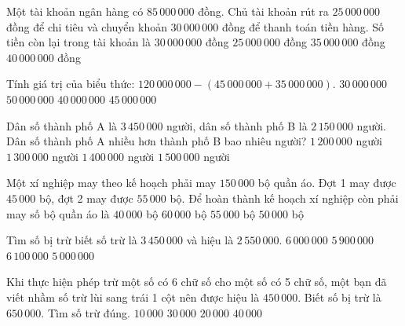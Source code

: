 \begin{ex} %
Một tài khoản ngân hàng có $85\,000\,000$ đồng. Chủ tài khoản rút ra $25\,000\,000$ đồng để chi tiêu và chuyển khoản $30\,000\,000$ đồng để thanh toán tiền hàng. Số tiền còn lại trong tài khoản là
\choice
{\True $30\,000\,000$ đồng}
{$25\,000\,000$ đồng}
{$35\,000\,000$ đồng}
{$40\,000\,000$ đồng}
\end{ex}

\begin{ex} %
Tính giá trị của biểu thức: $120\,000\,000 - (45\,000\,000 + 35\,000\,000)$.
\choice
{$30\,000\,000$}
{$50\,000\,000$}
{\True $40\,000\,000$}
{$45\,000\,000$}
\end{ex}

\begin{ex} %
Dân số thành phố A là $3\,450\,000$ người, dân số thành phố B là $2\,150\,000$ người. Dân số thành phố A nhiều hơn thành phố B bao nhiêu người?
\choice
{$1\,200\,000$ người}
{\True $1\,300\,000$ người}
{$1\,400\,000$ người}
{$1\,500\,000$ người}
\end{ex}

\begin{ex} %
Một xí nghiệp may theo kế hoạch phải may $150\,000$ bộ quần áo. Đợt 1 may được $45\,000$ bộ, đợt 2 may được $55\,000$ bộ. Để hoàn thành kế hoạch xí nghiệp còn phải may số bộ quần áo là
\choice
{$40\,000$ bộ}
{$60\,000$ bộ}
{$55\,000$ bộ}
{\True $50\,000$ bộ}
\end{ex}

\begin{ex} %
Tìm số bị trừ biết số trừ là $3\,450\,000$ và hiệu là $2\,550\,000$.
\choice
{\True $6\,000\,000$}
{$5\,900\,000$}
{$6\,100\,000$}
{$5\,000\,000$}
\end{ex}

\begin{ex} %
Khi thực hiện phép trừ một số có 6 chữ số cho một số có 5 chữ số, một bạn đã viết nhầm số trừ lùi sang trái 1 cột nên được hiệu là $450\,000$. Biết số bị trừ là $650\,000$. Tìm số trừ đúng.
\choice
{$10\,000$}
{$30\,000$}
{\True $20\,000$}
{$40\,000$}
\end{ex}

